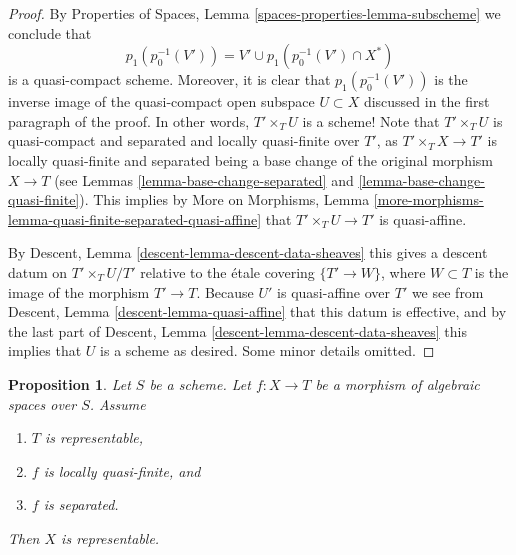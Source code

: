 \documentclass{stacks-project}
\theoremstyle{plain}
\newtheorem{proposition}[subsection]{Proposition}
\theoremstyle{definition}
\theoremstyle{remark}
\numberwithin{equation}{subsection}
\begin{document}
\begin{proof}
\medskip\noindent
By
Properties of Spaces, Lemma \ref{spaces-properties-lemma-subscheme}
we conclude that
$$
p_1(p_0^{-1}(V')) =
V' \cup p_1(p_0^{-1}(V') \cap X^*)
$$
is a quasi-compact scheme. Moreover, it is clear that
$p_1(p_0^{-1}(V'))$ is the inverse image of the
quasi-compact open subspace $U \subset X$ discussed in the
first paragraph of the proof. In other words, $T' \times_T U$ is a scheme!
Note that $T' \times_T U$ is quasi-compact and
separated and locally quasi-finite over $T'$, as
$T' \times_T X \to T'$ is locally quasi-finite and separated
being a base change of the original morphism $X \to T$ (see
Lemmas \ref{lemma-base-change-separated} and
\ref{lemma-base-change-quasi-finite}).
This implies by
More on Morphisms,
Lemma \ref{more-morphisms-lemma-quasi-finite-separated-quasi-affine}
that $T' \times_T U \to T'$ is quasi-affine.

\medskip\noindent
By
Descent, Lemma \ref{descent-lemma-descent-data-sheaves}
this gives a descent datum on $T' \times_T U / T'$
relative to the \'etale covering $\{T' \to W\}$, where $W \subset T$
is the image of the morphism $T' \to T$.
Because $U'$ is quasi-affine over $T'$ we see from
Descent, Lemma \ref{descent-lemma-quasi-affine}
that this datum is effective, and by the last part of
Descent, Lemma \ref{descent-lemma-descent-data-sheaves}
this implies that $U$ is a scheme as desired.
Some minor details omitted.
\end{proof}

\begin{proposition}
\label{proposition-locally-quasi-finite-separated-over-scheme}
Let $S$ be a scheme.
Let $f : X \to T$ be a morphism of algebraic spaces over $S$.
Assume
\begin{enumerate}
\item $T$ is representable,
\item $f$ is locally quasi-finite, and
\item $f$ is separated.
\end{enumerate}
Then $X$ is representable.
\end{proposition}
\end{document}
